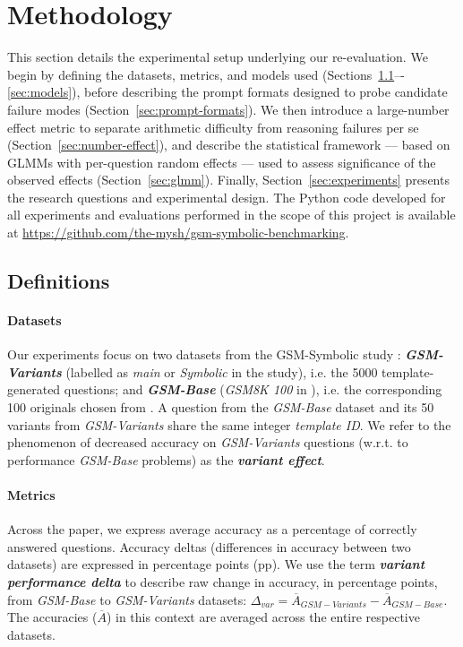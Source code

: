 \documentclass[11pt]{article}
\begin{document}
\section{Methodology}

This section details the experimental setup underlying our re-evaluation. We begin by defining the datasets, metrics, and models used (Sections~\ref{sec:definitions}–-\ref{sec:models}), before describing the prompt formats designed to probe candidate failure modes (Section~\ref{sec:prompt-formats}). We then introduce a large-number effect metric to separate arithmetic difficulty from reasoning failures per se (Section~\ref{sec:number-effect}), and describe the statistical framework — based on GLMMs with per-question random effects — used to assess significance of the observed effects (Section~\ref{sec:glmm}). Finally, Section~\ref{sec:experiments} presents the research questions and experimental design.
The Python code developed for all experiments and evaluations performed in the scope of this project is available at \url{https://github.com/the-mysh/gsm-symbolic-benchmarking}.

\subsection{Definitions}
\label{sec:definitions}
%
\paragraph{Datasets} Our experiments focus on two datasets from the GSM-Symbolic study \citep{mirzadeh2025gsm}: \textbf{\textit{GSM-Variants}} (labelled as \textit{main} or \textit{Symbolic} in the study), i.e. the 5000 template-generated questions; and \textbf{\textit{GSM-Base}} (\textit{GSM8K 100} in \citeauthor{mirzadeh2025gsm}), i.e. the corresponding 100 originals chosen from \citeauthor{cobbe2021gsm8k}. A question from the \textit{GSM-Base} dataset and its 50 variants from \textit{GSM-Variants} share the same integer
\textit{template ID}. We refer to the phenomenon of decreased accuracy on \textit{GSM-Variants} questions (w.r.t. to performance \textit{GSM-Base} problems) as the \textbf{\textit{variant effect}}.

\paragraph{Metrics}
Across the paper, we express average accuracy as a percentage of correctly answered questions. Accuracy deltas (differences in accuracy between two datasets) are expressed in percentage points (pp).
We use the term \textbf{\textit{variant performance delta}} to describe raw change in accuracy, in percentage points, from \textit{GSM-Base} to \textit{GSM-Variants} datasets: 
$\Delta_{var} = \overline{A}_{GSM-Variants} - \overline{A}_{GSM-Base}$. The accuracies ($\overline{A}$)
in this context are averaged across the entire respective datasets.
\end{document}
